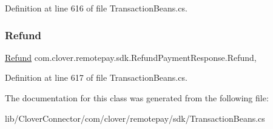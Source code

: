 Definition at line 616 of file Transaction\+Beans.\+cs.

\mbox{\label{classcom_1_1clover_1_1remotepay_1_1sdk_1_1_refund_payment_response_adeb3365694ecf3d5fbff2d77cf7aa7f8}} 
\subsubsection{\texorpdfstring{Refund}{Refund}}
{\footnotesize\ttfamily \hyperlink{classcom_1_1clover_1_1sdk_1_1v3_1_1payments_1_1_refund}{Refund} com.\+clover.\+remotepay.\+sdk.\+Refund\+Payment\+Response.\+Refund\hspace{0.3cm}{\ttfamily [get]}, {\ttfamily [set]}}



Definition at line 617 of file Transaction\+Beans.\+cs.



The documentation for this class was generated from the following file\+:\begin{DoxyCompactItemize}
\item 
lib/\+Clover\+Connector/com/clover/remotepay/sdk/Transaction\+Beans.\+cs\end{DoxyCompactItemize}
